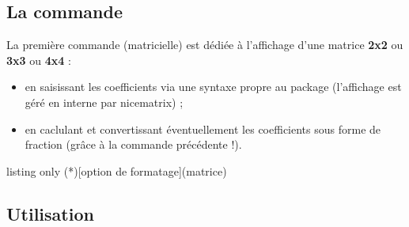 \documentclass[a4paper,11pt]{article}
\begin{document}
\subsection{La commande}

\begin{cautionblock}
La première commande (matricielle) est dédiée à l'affichage d'une matrice \textbf{2x2} ou \textbf{3x3} ou \textbf{4x4} :

\begin{itemize}
	\item en saisissant les coefficients via une syntaxe propre au package (l'affichage est géré en interne par \textsf{nicematrix}) ;
	\item en caclulant et convertissant éventuellement les coefficients sous forme de fraction (grâce à la commande précédente !).
\end{itemize}
\vspace*{-\baselineskip}\leavevmode
\end{cautionblock}

\begin{PresentationCode}{listing only}
\AffMatrice(*)[option de formatage](matrice)
\end{PresentationCode}

\subsection{Utilisation}
\end{document}
